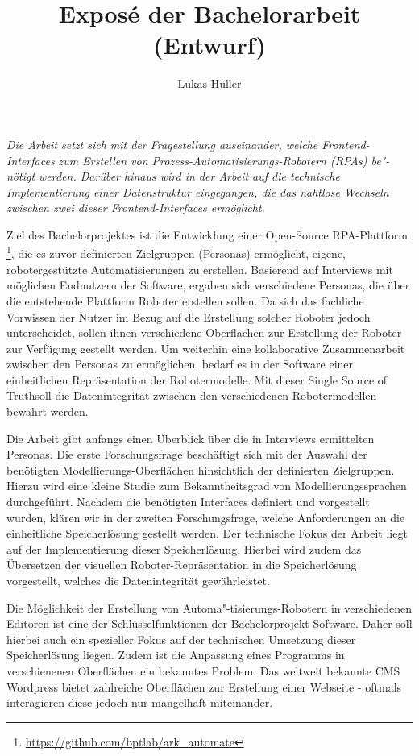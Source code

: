 \documentclass[a4paper, ngerman ]{article}
\title{Exposé der Bachelorarbeit (Entwurf)}
\author{Lukas Hüller}
\newcommand{\ssot}{\glqq Single Source of Truth\grqq{}}
\newcommand{\vspaceA}{\vspace{10pt}}
\begin{document}
\maketitle

\textit{Die Arbeit setzt sich mit der Fragestellung auseinander, welche Frontend-Interfaces zum Erstellen von Prozess-Automatisierungs-Robotern (RPAs) be"-nötigt werden. Darüber hinaus wird in der Arbeit auf die technische Implementierung einer Datenstruktur eingegangen, die das nahtlose Wechseln zwischen zwei dieser Frontend-Interfaces ermöglicht.}

\vspaceA

Ziel des Bachelorprojektes ist die Entwicklung einer Open-Source RPA-Plattform  \footnote{\url{https://github.com/bptlab/ark_automate}}, die es zuvor definierten Zielgruppen (Personas) ermöglicht, eigene, robotergestützte Automatisierungen zu erstellen. Basierend auf Interviews mit möglichen Endnutzern der Software, ergaben sich verschiedene Personas, die über die entstehende Plattform Roboter erstellen sollen. Da sich das fachliche Vorwissen der Nutzer im Bezug auf die Erstellung solcher Roboter jedoch unterscheidet, sollen ihnen verschiedene Oberflächen zur Erstellung der Roboter zur Verfügung gestellt werden. Um weiterhin eine kollaborative Zusammenarbeit zwischen den Personas zu ermöglichen, bedarf es in der Software einer einheitlichen Repräsentation der Robotermodelle. Mit dieser \ssot soll die Datenintegrität zwischen den verschiedenen Robotermodellen bewahrt werden. 

\vspaceA

Die Arbeit gibt anfangs einen Überblick über die in Interviews ermittelten Personas. Die erste Forschungsfrage beschäftigt sich mit der Auswahl der benötigten Modellierungs-Oberflächen hinsichtlich der definierten Zielgruppen. Hierzu wird eine kleine Studie zum Bekanntheitsgrad von Modellierungssprachen durchgeführt. Nachdem die benötigten Interfaces definiert und vorgestellt wurden, klären wir in der zweiten Forschungsfrage, welche Anforderungen an die einheitliche Speicherlösung gestellt werden. Der technische Fokus der Arbeit liegt auf der Implementierung dieser Speicherlösung. Hierbei wird zudem das Übersetzen der visuellen Roboter-Repräsentation in die Speicherlösung vorgestellt, welches die Datenintegrität gewährleistet. 

Die Möglichkeit der Erstellung von Automa"-tisierungs-Robotern in verschiedenen Editoren ist eine der Schlüsselfunktionen der Bachelorprojekt-Software. Daher soll hierbei auch ein spezieller Fokus auf der technischen Umsetzung dieser Speicherlösung liegen. Zudem ist die Anpassung eines Programms in verschienenen Oberflächen ein bekanntes Problem. Das weltweit bekannte CMS Wordpress bietet zahlreiche Oberflächen zur Erstellung einer Webseite - oftmals interagieren diese jedoch nur mangelhaft miteinander. 
\end{document}
